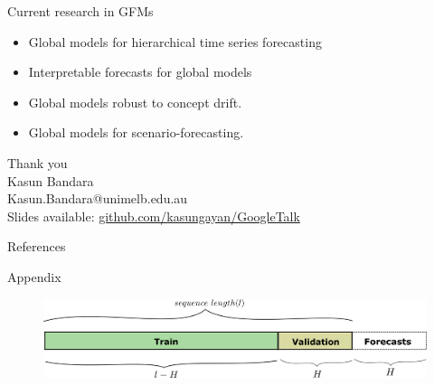 \documentclass{beamer}
\begin{document}
  
 \begin{frame}{Current research in GFMs}
  \begin{itemize}
  		\item Global models for hierarchical time series forecasting 
  		\vspace{2mm}
  		\item Interpretable forecasts for global models
  		\vspace{2mm}
  		\item Global models robust to concept drift.
  		\vspace{2mm}
  		\item Global models for scenario-forecasting.
		\end{itemize}
  \end{frame}  


  \begin{frame}
  \begin{center}
  {\Huge Thank you}\vspace{1cm}\\
  Kasun Bandara\vspace{0.2cm}\\
  \textcolor{DiCITSBlue}{Kasun.Bandara@unimelb.edu.au}\vspace{0.2cm}\\
  Slides available: \scriptsize{\url{github.com/kasungayan/GoogleTalk}}
  
  \end{center}
\end{frame}

\begin{frame}[allowframebreaks]{References} 
  \scriptsize


\end{frame}

\begin{frame}{Appendix}
  	\begin{figure}
   \includegraphics[scale=0.40]{images/trainvalidation}
   \caption{}
  \end{figure} 
\end{frame}


%
\end{document}
